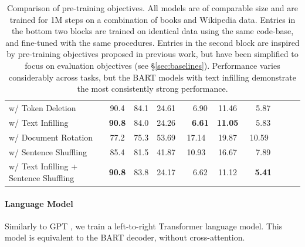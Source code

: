 \documentclass{article} %
\begin{document}
\begin{table}[ht]
\begin{center}
\begin{tabular}{lccccccccc}
w/ Token Deletion                &       90.4                &      84.1        &     24.61     &~~6.90          & 11.46                 &~~5.87\\ %
w/ Text Infilling                &       \textbf{90.8}                &     84.0        &     24.26     &~~\textbf{6.61} & \textbf{11.05}                &~~5.83\\ %
w/ Document Rotation             &       77.2                &      75.3        &     53.69     &17.14          & 19.87                &10.59\\ %
w/ Sentence Shuffling            &       85.4                &      81.5        &     41.87     &10.93          & 16.67               &~~7.89\\ %
w/ Text Infilling + Sentence Shuffling & \textbf{90.8}                &      83.8        &     24.17     &~~6.62          & 11.12               &~~\textbf{5.41} \\ %
\bottomrule
\end{tabular}
\end{center}

\caption{\label{table:ablations} Comparison of pre-training objectives. All models are of comparable size and are trained for 1M steps on a combination of books and Wikipedia data. Entries in the bottom two blocks are trained on identical data using the same code-base, and fine-tuned with the same procedures. Entries in the second block are inspired by pre-training objectives proposed in previous work, but have been simplified to focus on evaluation objectives (see \S\ref{sec:baselines}). Performance varies considerably across tasks, but the BART models with text infilling demonstrate the most consistently strong performance.} %
\end{table}

\paragraph{Language Model} Similarly to GPT \citep{gpt}, we train a left-to-right Transformer language model. This model is equivalent to the BART decoder, without cross-attention.
\end{document}
